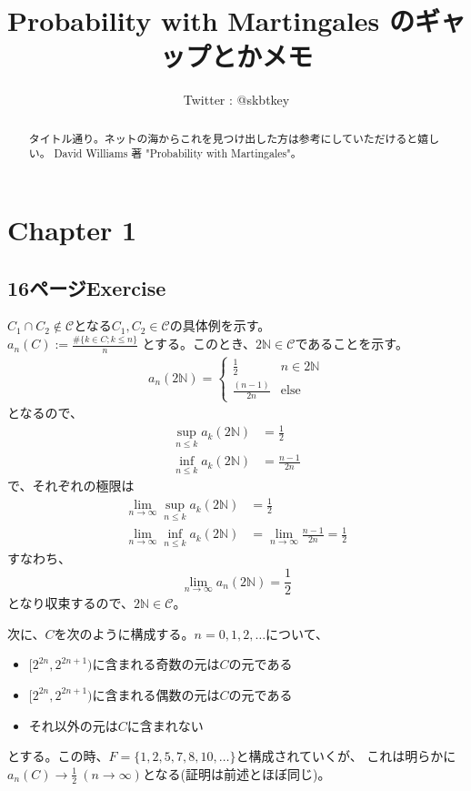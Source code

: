 \documentclass[11pt, a4paper]{jsarticle}
\title{Probability with Martingales のギャップとかメモ}
\author{Twitter : @skbtkey}
\date{}
\theoremstyle{definition}
\newcommand{\NN}{{\mathbb{N}}} %
\begin{document}
  \maketitle
  \begin{abstract}
    タイトル通り。ネットの海からこれを見つけ出した方は参考にしていただけると嬉しい。
    David Williams 著 "Probability with Martingales"。
  \end{abstract}

  \section{Chapter 1}
    \subsection{16ページExercise}
      $C_1\cap C_2\not\in\mathcal{C}$となる$C_1, C_2\in\mathcal{C}$の具体例を示す。\\
      $a_n(C) := \frac{\#\{k\in C; k\leq n\}}{n}$
      とする。このとき、$2\NN\in\mathcal{C}$であることを示す。
      \begin{align*}
        a_n(2\NN) = \left \{
        \begin{array}{cc}
          \frac{1}{2} & n\in 2\NN\\
          \frac{(n-1)}{2 n} & \mathrm{else}
        \end{array}
        \right.
      \end{align*}
      となるので、
      \begin{align*}
        \sup_{n\leq k} a_k(2\NN) &= \frac{1}{2}\\
        \inf_{n\leq k} a_k(2\NN) &= \frac{n-1}{2n}
      \end{align*}
      で、それぞれの極限は
      \begin{align*}
        \lim_{n\to\infty}\sup_{n\leq k} a_k(2\NN) &= \frac{1}{2}\\
        \lim_{n\to\infty}\inf_{n\leq k} a_k(2\NN) &= \lim_{n\to\infty}\frac{n-1}{2n} = \frac{1}{2}
      \end{align*}
      すなわち、
      \[
        \lim_{n\to\infty} a_n(2\NN) = \frac{1}{2}
      \]
      となり収束するので、$2\NN\in\mathcal{C}$。

      次に、$C$を次のように構成する。$n = 0,1,2,\ldots$について、
      \begin{itemize}
        \item $[2^{2n}, 2^{2n + 1})$に含まれる奇数の元は$C$の元である
        \item $[2^{2n}, 2^{2n + 1})$に含まれる偶数の元は$C$の元である
        \item それ以外の元は$C$に含まれない
      \end{itemize}
      とする。この時、$F = \{1,2,5,7,8,10,\ldots\}$と構成されていくが、
      これは明らかに$a_n(C)\to\frac{1}{2}\ (n\to\infty)$となる(証明は前述とほぼ同じ)。
      
\end{document}
